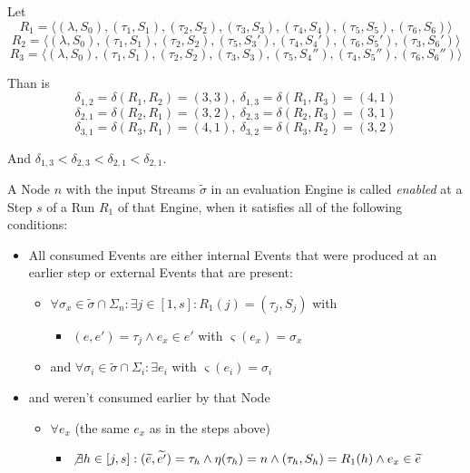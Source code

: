 \begin{exmp}
  Let
  \[R_1 = \langle (\lambda, S_0), (\tau_1,S_1), (\tau_2,S_2), (\tau_3,S_3), (\tau_4,S_4), (\tau_5,S_5), (\tau_6,S_6) \rangle\]
  \[R_2 = \langle (\lambda, S_0), (\tau_1,S_1), (\tau_2,S_2), (\tau_5,S_3'), (\tau_4,S_4'), (\tau_6,S_5'), (\tau_3,S_6') \rangle\]
  \[R_3 = \langle (\lambda, S_0), (\tau_1,S_1), (\tau_2,S_2), (\tau_3,S_3), (\tau_5,S_4''), (\tau_4,S_5''), (\tau_6,S_6'') \rangle\]

  Than is
  \[\delta_{1,2} = \delta(R_1,R_2) = (3,3),\ \delta_{1,3} = \delta(R_1,R_3) = (4,1)\]
  \[\delta_{2,1} = \delta(R_2,R_1) = (3,2),\ \delta_{2,3} = \delta(R_2,R_3) = (3,1)\]
  \[\delta_{3,1} = \delta(R_3,R_1) = (4,1),\ \delta_{3,2} = \delta(R_3,R_2) = (3,2)\]

  And \(\delta_{1,3} < \delta_{2,3} < \delta_{2,1} < \delta_{2,1}\).


\end{exmp}

\begin{definition}[name = Enabledness of a Node]\label{def:node_enabled}
  A Node \(n\) with the input Streams \(\widetilde{\sigma}\) in an evaluation Engine is called \emph{enabled} at a Step \(s\) of a Run \(R_1\) of that Engine, when it satisfies all of the following conditions:

  \begin{itemize}
    \item All consumed Events are either internal Events that were produced at an earlier step or external Events that are present:
      \begin{itemize}
        \item \(\forall \sigma_x \in \widetilde{\sigma} \cap \Sigma_n: \exists j \in [1, s]: R_1(j) = (\tau_j, S_j)\) with
          \begin{itemize}
            \item\( (e, e') = \tau_j \land e_x \in e'\) with \(\varsigma(e_x) = \sigma_x \)
          \end{itemize}
        \item and \(\forall \sigma_i \in \widetilde{\sigma} \cap\Sigma_i:\exists e_i\) with \(\varsigma(e_i) = \sigma_i\)
      \end{itemize}
    \item and weren't consumed earlier by that Node
      \begin{itemize}
        \item \(\forall e_x\) (the same \(e_x\) as in the steps above)
          \begin{itemize}
            \item \(\not\exists h \in [j, s]: (\widetilde{e}, \widetilde{e'}) = \tau_h \land \eta(\tau_h) = n \land (\tau_h, S_h) = R_1(h) \land e_x \in \widetilde{e}\)
          \end{itemize}
      \end{itemize}
  \end{itemize}
\end{definition}

